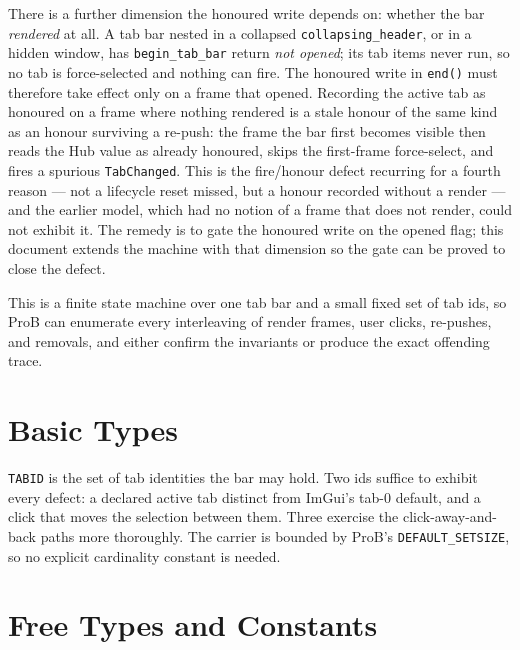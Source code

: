 \documentclass[a4paper,10pt,fleqn]{article}
\begin{document}
There is a further dimension the honoured write depends on: whether the bar
\emph{rendered} at all.  A tab bar nested in a collapsed
\texttt{collapsing\_header}, or in a hidden window, has \texttt{begin\_tab\_bar}
return \emph{not opened}; its tab items never run, so no tab is force-selected
and nothing can fire.  The honoured write in \texttt{end()} must therefore take
effect only on a frame that opened.  Recording the active tab as honoured on a
frame where nothing rendered is a stale honour of the same kind as an honour
surviving a re-push: the frame the bar first becomes visible then reads the Hub
value as already honoured, skips the first-frame force-select, and fires a
spurious \texttt{TabChanged}.  This is the fire/honour defect recurring for a
fourth reason --- not a lifecycle reset missed, but a honour recorded without a
render --- and the earlier model, which had no notion of a frame that does not
render, could not exhibit it.  The remedy is to gate the honoured write on the
opened flag; this document extends the machine with that dimension so the gate
can be proved to close the defect.

This is a finite state machine over one tab bar and a small fixed set of tab
ids, so ProB can enumerate every interleaving of render frames, user clicks,
re-pushes, and removals, and either confirm the invariants or produce the
exact offending trace.

\section{Basic Types}

\begin{zed}
  [TABID]
\end{zed}

\texttt{TABID} is the set of tab identities the bar may hold.  Two ids suffice
to exhibit every defect: a declared active tab distinct from ImGui's tab-0
default, and a click that moves the selection between them.  Three exercise the
click-away-and-back paths more thoroughly.  The carrier is bounded by ProB's
\texttt{DEFAULT\_SETSIZE}, so no explicit cardinality constant is needed.

\section{Free Types and Constants}
\end{document}
